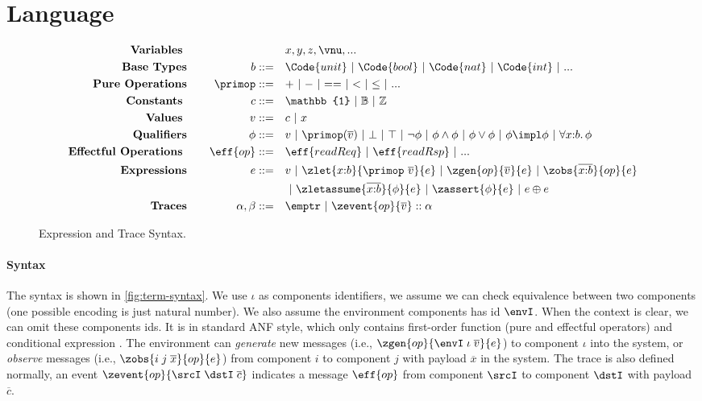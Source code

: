 \section{Language}

\begin{figure}[t!]
  \vspace{-.3cm}
{\footnotesize
{\small
  \begin{alignat*}{2}
    \text{\textbf{Variables }}& \quad &\quad& x, y, z, \vnu, ...
    \\\text{\textbf{Base Types}}& \quad & b  ::= \quad &  \Code{unit} ~|~ \Code{bool} ~|~ \Code{nat} ~|~ \Code{int} ~|~ ... 
    \\\text{\textbf{Pure Operations}}& \quad & \primop ::= \quad & {+} ~|~ {-} ~|~ {==} ~|~ {<} ~|~ {\leq} ~|~ ...
    \\ \text{\textbf{Constants }}& \quad &c ::= \quad & \mathbb{1} ~|~ \mathbb{B} ~|~ \mathbb{Z}
    \\ \text{\textbf{Values }}& \quad  & v ::= \quad & c ~|~ x
    \\ \text{\textbf{Qualifiers}}& \quad & \phi ::= \quad & v ~|~ \primop(\overline{v}) ~|~ \bot ~|~ \top  ~|~ \neg \phi ~|~ \phi \land \phi ~|~ \phi \lor \phi ~|~ \phi \impl \phi ~|~ \forall x{:}b.\, \phi
    \\\text{\textbf{Effectful Operations }}& \quad & \eff{op} ::= \quad & \eff{readReq} ~|~ \eff{readRsp} ~|~  ...
    \\ \text{\textbf{Expressions}}& \quad & e ::=\quad & v ~|~ \zlet{x{:}b}{\primop\ \overline{v}}{e} ~|~ \zgen{op}{\overline{v}}{e} ~|~ \zobs{\overline{x{:}b}}{op}{e} 
    \\ & & \quad & ~|~\zletassume{\overline{x{:}b}}{\phi}{e} ~|~  \zassert{\phi}{e} ~|~ e \oplus e
    \\\text{\textbf{Traces}}& \quad &\alpha,\beta ::= \quad &
    \emptr ~|~ \zevent{op}{\overline{v}} \;{::}\; \alpha
  \end{alignat*}}
  }
\caption{Expression and Trace Syntax. }
\label{fig:term-syntax}
\end{figure}

\paragraph{Syntax} The syntax is shown in \autoref{fig:term-syntax}. We use $\iota$ as components identifiers, we assume we can check equivalence between two components (one possible encoding is just natural number). We also assume the environment components has id $\envI$. When the context is clear, we can omit these components ids.
It is in standard ANF style, which only contains first-order function (pure and effectful operators) and conditional expression .
The environment can \emph{generate} new messages (i.e., $\zgen{op}{\envI\;\iota\;\overline{v}}{e}$) to component $\iota$ into the system, or \emph{observe} messages (i.e., $\zobs{i\;j\;\overline{x}}{op}{e}$) from component $i$ to component $j$ with payload $\overline{x}$ in the system. The trace is also defined normally, an event $\zevent{op}{\srcI\;\dstI\;\overline{c}}$ indicates a message $\eff{op}$ from component $\srcI$ to component $\dstI$ with payload $\overline{c}$.


